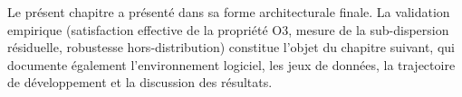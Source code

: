 Le présent chapitre a présenté \Oracle{} dans sa forme architecturale finale. La validation empirique (satisfaction effective de la propriété O3, mesure de la sub-dispersion résiduelle, robustesse hors-distribution) constitue l'objet du chapitre suivant, qui documente également l'environnement logiciel, les jeux de données, la trajectoire de développement et la discussion des résultats.

